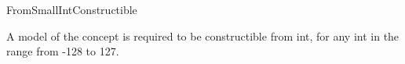 \begin{ccRefConcept}{FromSmallIntConstructible}


\ccDefinition
  
A model of the concept  is required 
to be constructible from int, 
for any int in the range from -128 to 127. 

\ccCreation
{}  %


\ccHasModels
{}\\
\\
\\


\end{ccRefConcept}